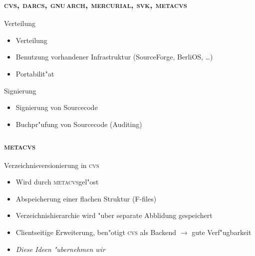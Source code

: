 \documentclass[german]{beamer}
\newcommand{\METACVS}{\textsc{metacvs}}
\newcommand{\CVS}{\textsc{cvs}}
\newcommand{\DARCS}{\textsc{darcs}}
\newcommand{\GNUARCH}{\textsc{gnu\,arch}}
\newcommand{\MERCURIAL}{\textsc{mercurial}}
\newcommand{\SVK}{\textsc{svk}}
\begin{document}
\begin{frame}
  \frametitle{\CVS, \DARCS, \GNUARCH, \MERCURIAL, \SVK, \METACVS}
  \begin{block}{Verteilung}
    \begin{itemize}
    \item Verteilung
    \item Benutzung vorhandener Infrastruktur (SourceForge, BerliOS,
      \ldots)
    \item Portabilit"at
    \end{itemize}
  \end{block}
  \begin{block}{Signierung}
    \begin{itemize}
    \item Signierung von Sourcecode
    \item Buchpr"ufung von Sourcecode (Auditing)
    \end{itemize}
  \end{block}
  
\end{frame}

\begin{frame}
  \frametitle{\METACVS}
  \begin{block}{Verzeichnisversionierung in \CVS}
    \begin{itemize}
    \item Wird durch \METACVS gel"ost
    \item Abspeicherung einer flachen Struktur (F-files)
    \item Verzeichnishierarchie wird "uber separate Abblidung
      gespeichert
    \item Clientseitige Erweiterung, ben"otigt \CVS{} als Backend
      $\rightarrow$ gute Verf"ugbarkeit
    \item \emph{Diese Ideen "ubernehmen wir}
    \end{itemize}
  \end{block}
\end{frame}
\end{document}
